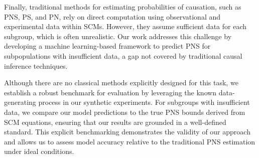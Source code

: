 Finally, traditional methods for estimating probabilities of causation, such as PNS, PS, and PN, rely on direct computation using observational and experimental data within SCMs. However, they assume sufficient data for each subgroup, which is often unrealistic. Our work addresses this challenge by developing a machine learning-based framework to predict PNS for subpopulations with insufficient data, a gap not covered by traditional causal inference techniques.  

Although there are no classical methods explicitly designed for this task, we establish a robust benchmark for evaluation by leveraging the known data-generating process in our synthetic experiments. For subgroups with insufficient data, we compare our model predictions to the true PNS bounds derived from SCM equations, ensuring that our results are grounded in a well-defined standard. This explicit benchmarking demonstrates the validity of our approach and allows us to assess model accuracy relative to the traditional PNS estimation under ideal conditions.  





